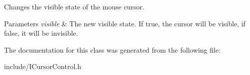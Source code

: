 Changes the visible state of the mouse cursor. 


\begin{DoxyParams}{Parameters}
{\em visible} & The new visible state. If true, the cursor will be visible, if false, it will be invisible. \\
\hline
\end{DoxyParams}


The documentation for this class was generated from the following file\+:\begin{DoxyCompactItemize}
\item 
include/I\+Cursor\+Control.\+h\end{DoxyCompactItemize}
